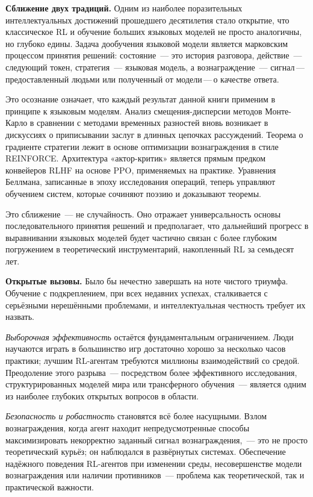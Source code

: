 \medskip

\textbf{Сближение двух традиций.}\quad
Одним из наиболее поразительных интеллектуальных достижений прошедшего десятилетия стало открытие, что классическое RL и обучение больших языковых моделей не просто аналогичны, но глубоко едины. Задача дообучения языковой модели является марковским процессом принятия решений: состояние~--- это история разговора, действие~--- следующий токен, стратегия~--- языковая модель, а вознаграждение~--- сигнал\,---\,предоставленный людьми или полученный от модели\,---\,о качестве ответа.

Это осознание означает, что каждый результат данной книги применим в принципе к языковым моделям. Анализ смещения-дисперсии методов Монте-Карло в сравнении с методами временных разностей вновь возникает в дискуссиях о приписывании заслуг в длинных цепочках рассуждений. Теорема о градиенте стратегии лежит в основе оптимизации вознаграждения в стиле REINFORCE. Архитектура «актор-критик» является прямым предком конвейеров RLHF на основе PPO, применяемых на практике. Уравнения Беллмана, записанные в эпоху исследования операций, теперь управляют обучением систем, которые сочиняют поэзию и доказывают теоремы.

Это сближение~--- не случайность. Оно отражает универсальность основы последовательного принятия решений и предполагает, что дальнейший прогресс в выравнивании языковых моделей будет частично связан с более глубоким погружением в теоретический инструментарий, накопленный RL за семьдесят лет.

\medskip

\textbf{Открытые вызовы.}\quad
Было бы нечестно завершать на ноте чистого триумфа. Обучение с подкреплением, при всех недавних успехах, сталкивается с серьёзными нерешёнными проблемами, и интеллектуальная честность требует их назвать.

\emph{Выборочная эффективность} остаётся фундаментальным ограничением. Люди научаются играть в большинство игр достаточно хорошо за несколько часов практики; лучшим RL-агентам требуются миллионы взаимодействий со средой. Преодоление этого разрыва~--- посредством более эффективного исследования, структурированных моделей мира или трансферного обучения~--- является одним из наиболее глубоких открытых вопросов в области.

\emph{Безопасность и робастность} становятся всё более насущными. Взлом вознаграждения, когда агент находит непредусмотренные способы максимизировать некорректно заданный сигнал вознаграждения,~--- это не просто теоретический курьёз; он наблюдался в развёрнутых системах. Обеспечение надёжного поведения RL-агентов при изменении среды, несовершенстве модели вознаграждения или наличии противников~--- проблема как теоретической, так и практической важности.

